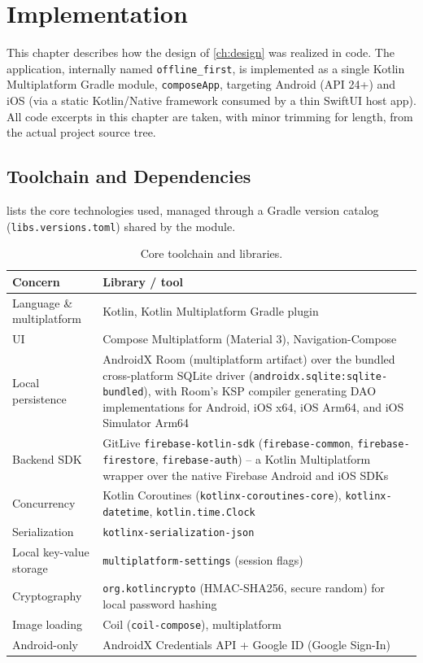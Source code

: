 \chapter{Implementation}
\label{ch:implementation}

This chapter describes how the design of \cref{ch:design} was realized in
code. The application, internally named \texttt{offline\_first}, is
implemented as a single Kotlin Multiplatform Gradle module,
\texttt{composeApp}, targeting Android (API 24+) and iOS (via a static
Kotlin/Native framework consumed by a thin SwiftUI host app). All code
excerpts in this chapter are taken, with minor trimming for length, from
the actual project source tree.

\section{Toolchain and Dependencies}
\label{sec:toolchain}

 lists the core technologies used, managed through a
Gradle version catalog (\texttt{libs.versions.toml}) shared by the module.

\begin{table}[htbp]
\centering
\caption{Core toolchain and libraries.}
\label{tab:toolchain}
\begin{tabularx}{\textwidth}{@{}l X@{}}
\toprule
\textbf{Concern} & \textbf{Library / tool} \\
\midrule
Language \& multiplatform & Kotlin, Kotlin Multiplatform Gradle plugin \\
UI & Compose Multiplatform (Material 3), Navigation-Compose \\
Local persistence & AndroidX Room (multiplatform artifact) over the
bundled cross-platform SQLite driver (\texttt{androidx.sqlite:sqlite-\allowbreak
bundled}), with Room's KSP compiler generating DAO implementations for
Android, iOS x64, iOS Arm64, and iOS Simulator Arm64 \\
Backend SDK & GitLive \texttt{firebase-kotlin-sdk} (\texttt{firebase-common},
\texttt{firebase-firestore}, \texttt{firebase-auth}) -- a Kotlin
Multiplatform wrapper over the native Firebase Android and iOS SDKs \\
Concurrency & Kotlin Coroutines (\texttt{kotlinx-coroutines-core}),
\texttt{kotlinx-datetime}, \texttt{kotlin.time.Clock} \\
Serialization & \texttt{kotlinx-serialization-json} \\
Local key-value storage & \texttt{multiplatform-settings} (session flags) \\
Cryptography & \texttt{org.kotlincrypto} (HMAC-SHA256, secure random) for
local password hashing \\
Image loading & Coil (\texttt{coil-compose}), multiplatform \\
Android-only & AndroidX Credentials API + Google ID (Google Sign-In) \\
\bottomrule
\end{tabularx}
\end{table}

